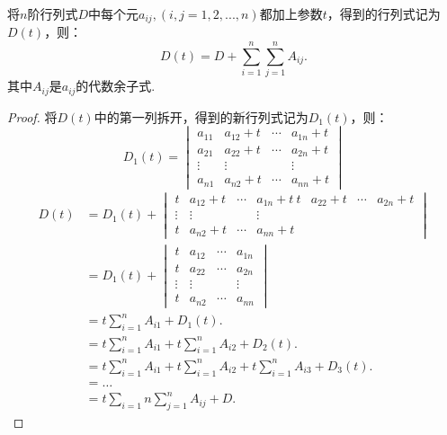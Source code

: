 \begin{theorem}{}{}
    将$n$阶行列式$D$中每个元$a_{ij},(i,j=1,2,...,n)$都加上参数$t$，得到的行列式记为$D(t)$，则：
    \[D(t)=D+\sum_{i=1}^n\sum_{j=1}^nA_{ij}.\]
    其中$A_{ij}$是$a_{ij}$的代数余子式.
\end{theorem}
\begin{proof}{}{}
    将$D(t)$中的第一列拆开，得到的新行列式记为$D_1(t)$，则：
    \[D_1(t)=\begin{vmatrix}a_{11}&a_{12}+t&\cdots&a_{1n}+t\\
        a_{21}&a_{22}+t&\cdots&a_{2n}+t\\
        \vdots&\vdots&&\vdots\\
        a_{n1}&a_{n2}+t&\cdots&a_{nn}+t\end{vmatrix}\]
    \begin{align*}
        D(t)&=D_1(t)+\begin{vmatrix}t&a_{12}+t&\cdots&a_{1n}+t\
        t&a_{22}+t&\cdots&a_{2n}+t\\\vdots&\vdots&&\vdots\\
        t&a_{n2}+t&\cdots&a_{nn}+t\end{vmatrix}\\
        &=D_1(t)+
        \begin{vmatrix}t&a_{12}&\cdots&a_{1n}\\
            t&a_{22}&\cdots&a_{2n}\\
            \vdots&\vdots&&\vdots\\
            t&a_{n2}&\cdots&a_{nn}\end{vmatrix}\\
        &=t\sum_{i=1}^nA_{i1}+D_1(t).\\
        &=t\sum_{i=1}^nA_{i1}+t\sum_{i=1}^nA_{i2}+D_2(t).\\
        &=t\sum_{i=1}^nA_{i1}+t\sum_{i=1}^nA_{i2}+t\sum_{i=1}^nA_{i3}+D_3(t).\\
        &=\dots\\
        &=t\sum_{i=1}{n}\sum_{j=1}^nA_{ij}+D.
        \end{align*}
\end{proof}

